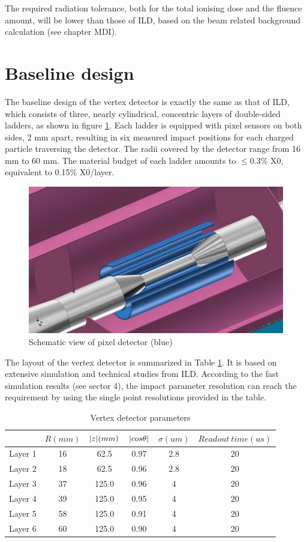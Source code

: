 The required radiation tolerance, both for the total ionising dose and the fluence amount, will be lower than those of ILD, based on the beam related background calculation (see chapter MDI).


\section{Baseline design}
The baseline design of the vertex detector is exactly the same as that of ILD, which consists of three, nearly cylindrical, concentric layers of double-sided ladders, as shown in figure \ref{fig:view}. Each ladder is equipped with pixel sensors on both sides, 2 mm apart, resulting in six measured impact positions for each charged particle traversing the detector. The radii covered by the detector range from 16 mm to 60 mm. The material budget of each ladder amounts to $\leqslant$0.3\% X0, equivalent to 0.15\% X0/layer.
\begin{figure}[h!]
	\centering
	\includegraphics[scale=1.5]{Figures/Vertex/view_of_pixel.jpg}
	\caption{Schematic view of pixel detector (blue)}
	\label{fig:view}
\end{figure}


The layout of the vertex detector is summarized in Table \ref{tab:structure}. It is based on extensive simulation and technical studies from ILD. According to the fast simulation results (see sector 4), the impact parameter resolution can reach the requirement by using the single point resolutions provided in the table.
\begin{table}[!h]
	\centering
	\begin{tabular}{c|c|c|c|c|c}
		\hline
		\ & $R(mm)$ & $\arrowvert z \arrowvert(mm)$ & $\arrowvert cos \theta\arrowvert$ & $\sigma(um)$ & $Readout\ time(us)$\\
		\hline
		Layer 1 & 16 & 62.5 & 0.97 & 2.8 & 20 \\
		\hline
		Layer 2 & 18 & 62.5 & 0.96 & 2.8 & 20 \\
		\hline
		Layer 3 & 37 & 125.0 & 0.96 & 4 & 20 \\
		\hline
		Layer 4 & 39 & 125.0 & 0.95 & 4 & 20 \\
		\hline
		Layer 5 & 58 & 125.0 & 0.91 & 4 & 20 \\
		\hline
		Layer 6 & 60 & 125.0 & 0.90 & 4 & 20 \\
		\hline
	\end{tabular}
	\caption{Vertex detector parameters}
	\label{tab:structure}
\end{table}


